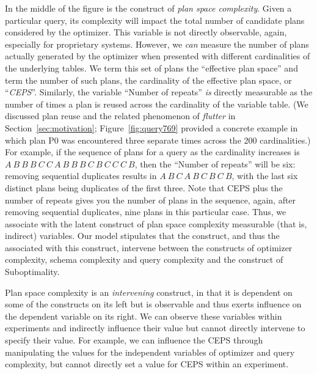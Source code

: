 \documentclass[prodmode,acmtods]{acmsmall}
\begin{document}
In the middle of the figure is the construct of {\em plan space
complexity}. Given a particular query, its
complexity will impact the total number of candidate plans considered
by the optimizer. This variable is not directly
observable, again, especially for proprietary \hbox{systems}. However, we {\em
can} measure the number of plans actually generated by the optimizer
when presented with different cardinalities of the underlying tables.
We term this set of plans the ``effective plan
space'' and term the number of such plans, the cardinality of the
effective plan space, or ``{\em CEPS}''. Similarly,  the variable ``Number of repeats'' {\em is}
directly measurable as the number
of times a plan is reused across the cardinality of the variable table. (We
discussed plan reuse and the related phenomenon of {\em flutter} in
Section~\ref{sec:motivation}; Figure~\ref{fig:query769} provided a concrete
example in which plan P0 was encountered three separate times across the 200
cardinalities.) For
example, if the sequence of plans for a query as the cardinality increases
is $A ~ B ~ B ~ B ~ C ~ C ~ A ~ B ~ B~ B ~ C ~ B ~ C ~ C ~ C ~ B$, then the
``Number of repeats'' will be six: removing sequential duplicates results in $A ~ B ~ C
~ A ~ B ~ C ~ B ~ C ~ B$, with the last six distinct plans being duplicates
of the first three. Note that CEPS plus the number of repeats gives you the
number of plans in the sequence, again, after removing sequential
duplicates, nine plans in this particular case. Thus, we associate with the latent construct
of plan space complexity  measurable (that is, indirect) variables. Our
  model stipulates that the construct, and thus the  associated with
  this construct, intervene between the constructs of optimizer complexity,
  schema complexity and query complexity and the construct of Suboptimality.

Plan space complexity is an {\em intervening} construct, in that it is dependent
on some of the constructs on its left but is observable and thus exerts influence on the dependent
variable on its right. We can observe these variables within experiments and
indirectly influence their value but
cannot directly intervene to specify their value. For example, we can influence the CEPS through
manipulating the values for the independent variables of optimizer and query
complexity, but cannot directly set a value for CEPS within an
experiment.
\end{document}
